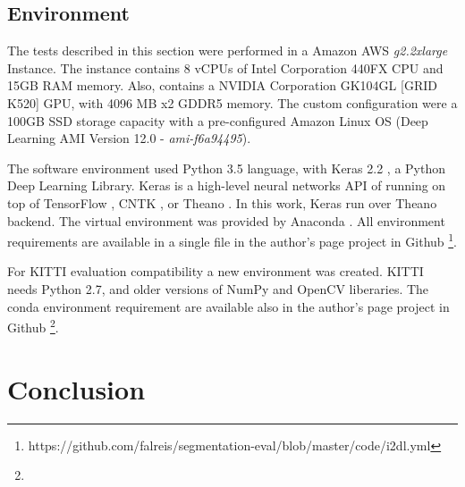 \documentclass[10pt,twocolumn,letterpaper]{article}
\begin{document}

\subsection{Environment} \label{ssec:environment}

The tests described in this section were performed in a Amazon AWS \cite{AMAZON_WEBSITE} \textit{g2.2xlarge} Instance. The instance contains 8 vCPUs of Intel Corporation 440FX CPU and 15GB RAM memory. Also, contains a NVIDIA Corporation GK104GL [GRID K520] GPU, with 4096 MB x2 GDDR5 memory. The custom configuration were a 100GB SSD storage capacity with a pre-configured Amazon Linux OS (Deep Learning AMI Version 12.0 - \textit{ami-f6a94495}).

The software environment used Python 3.5 \cite{PYTHON_WEBSITE} language, with Keras 2.2 \cite{KERAS}, a Python Deep Learning Library. Keras is a high-level neural networks API of running on top of TensorFlow \cite{TENSORFLOW}, CNTK \cite{CNTK}, or Theano \cite{THEANO} \cite{KERAS}. In this work, Keras run over Theano \cite{THEANO} backend. The virtual environment was provided by Anaconda \cite{ANACONDA_WEBSITE}. All environment requirements are available in a single file in the author's page project in Github \footnote{https://github.com/falreis/segmentation-eval/blob/master/code/i2dl.yml}.

For KITTI evaluation compatibility a new environment was created. KITTI needs Python 2.7, and older versions of NumPy and OpenCV liberaries. The conda environment requirement are available also in the author's page project in Github \footnote{}.

\section{Conclusion} \label{sec:conclusion}



{\small


}
\end{document}
